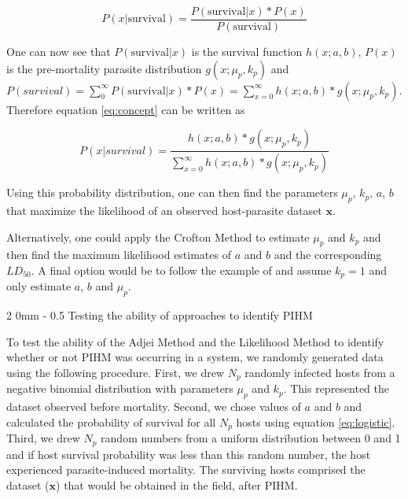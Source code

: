 \documentclass[12pt, a4paper]{article}
\makeatletter
\renewcommand{\subsection}{\@startsection
{subsection}%
{2}%
{0mm}%
{-\baselineskip}%
{0.5\baselineskip}%
{\normalfont\bf}} %
\makeatother
\begin{document}
\begin{equation}
    P(x | \text{survival}) = \dfrac{P(\text{survival} | x) * P(x)}{P(\text{survival})}
    \label{eq:concept}
\end{equation}

One can now see that $P(\text{survival} | x)$ is the survival function $h(x; a, b)$, $P(x)$ is the pre-mortality parasite distribution $g(x; \mu_p, k_p)$ and $P(survival) = \sum_0^{\infty} P(\text{survival} | x) * P(x) =  \sum_{x=0}^{\infty} h(x; a, b)  * g(x; \mu_p, k_p)$. Therefore equation \ref{eq:concept} can be written as

\begin{equation}
    P(x | survival) = \dfrac{h(x; a, b)  * g(x; \mu_p, k_p)}{\sum_{x=0}^{\infty} h(x; a, b)  * g(x; \mu_p, k_p)}
    \label{eq:dist}
\end{equation}

Using this probability distribution, one can then find the parameters $\mu_p$, $k_p$, $a$, $b$ that maximize the likelihood of an observed host-parasite dataset $\mathbf{x}$.

Alternatively, one could apply the Crofton Method to estimate $\mu_p$ and $k_p$ and then find the maximum likelihood estimates of $a$ and $b$ and the corresponding $LD_{50}$.  A final option would be to follow the example of \citep{Ferguson2011} and assume $k_p = 1$ and only estimate $a$, $b$ and $\mu_p$.

\subsection{Testing the ability of approaches to identify PIHM}

To test the ability of the Adjei Method and the Likelihood Method to identify whether or not PIHM was occurring in a system, we randomly generated data using the following procedure.  First, we drew $N_p$ randomly infected hosts from a
negative binomial distribution with parameters $\mu_p$ and $k_p$.  This represented the dataset observed before mortality. Second, we chose values of $a$ and $b$ and calculated the probability of survival
for all $N_p$ hosts using equation \ref{eq:logistic}.  Third, we drew $N_p$ random numbers from a uniform distribution
between 0 and 1 and if host survival probability was less than this random
number, the host experienced parasite-induced mortality.  The surviving
hosts comprised the dataset ($\mathbf{x}$) that would be obtained in the field, after PIHM.
\end{document}
